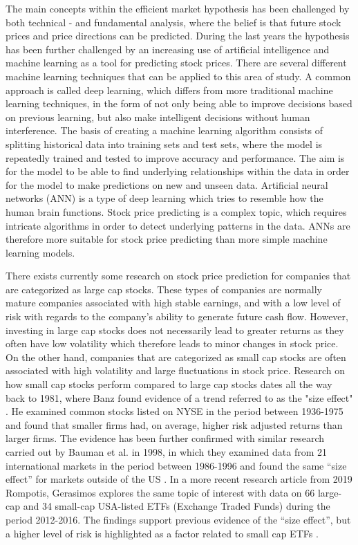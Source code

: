 \indent \newline 
The main concepts within the efficient market hypothesis has been challenged by both technical - and fundamental analysis, where the belief is that future stock prices and price directions can be predicted. During the last years the hypothesis has been further challenged by an increasing use of artificial intelligence and machine learning as a tool for predicting stock prices. There are several different machine learning techniques that can be applied to this area of study. A common approach is called deep learning, which differs from more traditional machine learning techniques, in the form of not only being able to improve decisions based on previous learning, but also make intelligent decisions without human interference. The basis of creating a machine learning algorithm consists of splitting historical data into training sets and test sets, where the model is repeatedly trained and tested to improve accuracy and performance. The aim is for the model to be able to find underlying relationships within the data in order for the model to make predictions on new and unseen data. Artificial neural networks (ANN) is a type of deep learning which tries to resemble how the human brain functions. Stock price predicting is a complex topic, which requires intricate algorithms in order to detect underlying patterns in the data. ANNs are therefore more suitable for stock price predicting than more simple machine learning models.

\indent \newline 
There exists currently some research on stock price prediction for companies that are categorized as large cap stocks. These types of companies are normally mature companies associated with high stable earnings, and with a low level of risk with regards to the company's ability to generate future cash flow. However, investing in large cap stocks does not necessarily lead to greater returns as they often have low volatility which therefore leads to minor changes in stock price. On the other hand, companies that are categorized as small cap stocks are often associated with high volatility and large fluctuations in stock price. Research on how small cap stocks perform compared to large cap stocks dates all the way back to 1981, where Banz found evidence of a trend referred to as the "size effect" \cite{BANZ19813}. He examined common stocks listed on NYSE in the period between 1936-1975 and found that smaller firms had, on average, higher risk adjusted returns than larger firms. The evidence has been further confirmed with similar research carried out by Bauman et al. in 1998, in which they examined data from 21 international markets in the period between 1986-1996 and found the same “size effect” for markets outside of the US \cite{bauman}. In a more recent research article from 2019 Rompotis, Gerasimos explores the same topic of interest with data on 66 large-cap and 34 small-cap USA-listed ETFs (Exchange Traded Funds) during the period 2012-2016. The findings support previous evidence of the “size effect”, but a higher level of risk is highlighted as a factor related to small cap ETFs \cite{rompotis}.

